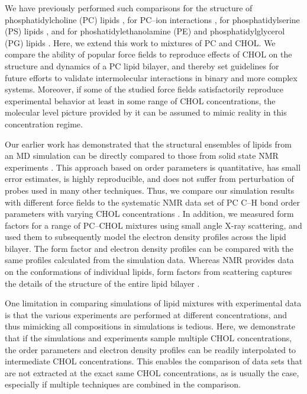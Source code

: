 \documentclass[journal=jctcce]{achemso}
\begin{document}
We have previously performed such comparisons for the structure of phosphatidylcholine (PC) lipids \cite{botan15}, for PC--ion interactions \cite{catte2016molecular}, for phosphatidylserine (PS) lipids \cite{antila2019headgroup}, and for phoshatidylethanolamine (PE) and phosphatidylglycerol (PG) lipids \cite{bacle2021inverse}. Here, we extend this work to mixtures of PC and CHOL. We compare the ability of popular force fields to reproduce effects of CHOL on the structure and dynamics of a PC lipid bilayer, and thereby set guidelines for future efforts to validate intermolecular interactions in binary and more complex systems. Moreover, if some of the studied force fields satisfactorily reproduce experimental behavior at least in some range of CHOL concentrations, the molecular level picture provided by it can be assumed to mimic reality in this concentration regime. 

Our earlier work has demonstrated that the structural ensembles of lipids from an MD simulation can be directly compared to those from solid state NMR experiments \cite{botan15,catte2016molecular,antila2019headgroup,bacle2021inverse}. This approach based on order parameters is quantitative, has small error estimates, is highly reproducible, and does not suffer from perturbation of probes used in many other techniques. Thus, we compare our simulation results with different force fields to the systematic NMR data set of PC C--H bond order parameters with varying CHOL concentrations \cite{ferreira13}. In addition, we measured form factors for a range of PC--CHOL mixtures using small angle X-ray scattering, and used them to subsequently model the electron density profiles across the lipid bilayer. The form factor and electron density profiles can be compared with the same profiles calculated from the simulation data. Whereas NMR provides data on the conformations of individual lipids, form factors from scattering captures the details of the structure of the entire lipid bilayer \cite{ollila16}. 

One limitation in comparing simulations of lipid mixtures with experimental data is that the various experiments are performed at different concentrations, and thus mimicking all compositions in simulations is tedious. Here, we demonstrate that if the simulations and experiments sample multiple CHOL concentrations, the order parameters and electron density profiles can be readily interpolated to intermediate CHOL concentrations. This enables the comparison of data sets that are not extracted at the exact same CHOL concentrations, as is usually the case, especially if multiple techniques are combined in the comparison. 
\end{document}
